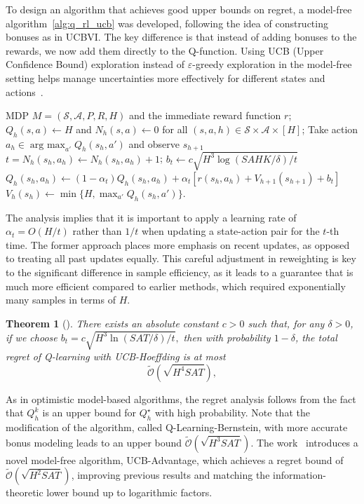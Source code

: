 \documentclass{article}
\numberwithin{equation}{section}
\newtheorem{theorem}{Theorem}
\newcommand{\cA}{\mathcal{A}}
\newcommand{\cS}{\mathcal{S}}
\DeclareMathOperator*{\argmax}{arg\ max}
\begin{document}
To design an algorithm that achieves good upper bounds on regret, a model-free algorithm~\ref{alg:q_rl_ucb} was developed, following the idea of constructing bonuses as in UCBVI. The key difference is that instead of adding bonuses to the rewards, we now add them directly to the Q-function.
Using UCB (Upper Confidence Bound) exploration instead of $\varepsilon$-greedy exploration in the model-free setting helps manage uncertainties more effectively for different states and actions~\cite{jin2018q}.
\begin{algorithm}[H]
    \centering
    \caption{Q-learning with UCB-Hoeffding}
    \label{alg:q_rl_ucb}
    \begin{algorithmic}[1]
         MDP $M = (\cS, \cA, P, R, H)$ and the immediate reward function $r$;
         $Q_h(s,a)\leftarrow H$ and $N_h(s,a) \leftarrow 0$ for all $(s,a,h) \in {\cS\times \cA}\times [H]$;
          \STATE Take action \(a_h\in \argmax_{a'}Q_h(s_h,a')\) and observe \(s_{h+1}\)\\
          \(t=N_h(s_h,a_h) \leftarrow N_h(s_h,a_h) + 1\); \(b_t\leftarrow c\sqrt{H^3 \log{(SAHK/\delta)}/t}\)\\
          \(Q_h(s_h,a_h)\leftarrow (1-\alpha_t)Q_h(s_h,a_h) + \alpha_t[r(s_h,a_h) + V_{h+1}(s_{h+1}) + b_t]\)\\
          \(V_h(s_h)\leftarrow \min{\{H,\max_{a'}Q_h(s_h,a')\}}.\)
          \ENDFOR
        \ENDFOR
    \end{algorithmic}
\end{algorithm}
The analysis implies that it is important to apply a learning rate of \(\alpha_t = O(H/t)\) rather than \(1/t\) when updating a state-action pair for the \(t\)-th time. The former approach places more emphasis on recent updates, as opposed to treating all past updates equally. This careful adjustment in reweighting is key to the significant difference in sample efficiency, as it leads to a guarantee that is much more efficient compared to earlier methods, which required exponentially many samples in terms of \(H\).
\begin{theorem}[\cite{jin2018q}]
     There exists an absolute constant $c > 0$ such that, for any $\delta>0$, if we choose \(b_t = c \sqrt{H^3 \ln(SAT/\delta) / t},
\) 
then with probability $1 - \delta$, the total regret of Q-learning with UCB-Hoeffding is at most
\[
\widetilde{\mathcal{O}}(\sqrt{H^4 SAT}),
\]
\end{theorem}
As in optimistic model-based algorithms, the regret analysis follows from the fact that \(Q_h^k\) is an upper bound for \(Q_h^\star\) with high probability. Note that the modification of the algorithm, called Q-Learning-Bernstein, with more accurate bonus modeling leads to an upper bound \(\widetilde{\mathcal{O}}(\sqrt{H^3 SAT})
\). {The work~\cite{zhang2020almost} introduces} a novel model-free algorithm, UCB-Advantage, which achieves a regret bound of \(\widetilde{\mathcal{O}}(\sqrt{H^2SAT})\), improving previous results and matching the information-theoretic lower bound up to logarithmic factors.
\end{document}
